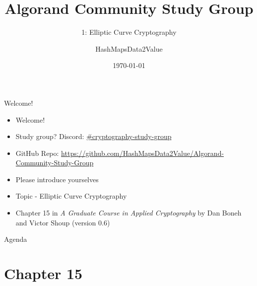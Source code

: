 \documentclass[aspectratio=169,xcolor=dvipsnames]{beamer}
\title[short title]{Algorand Community Study Group}
\subtitle{1: Elliptic Curve Cryptography}
\author[HMD2V] {HashMapsData2Value}
\institute[Algorand] %
{
    Digital Community Champion \\
    Algorand Foundation \\
    \vskip 3pt
}
\date{\today} %
\begin{document}
\begin{frame}
    \titlepage
\end{frame}


\begin{frame}{Welcome!}
\begin{itemize}
    \item Welcome!
    \item Study group? Discord: \href{https://discordapp.com/channels/491256308461207573/1092424979091566622}{\#cryptography-study-group}
    \item GitHub Repo: \href{https://github.com/HashMapsData2Value/Algorand-Community-Study-Group/tree/main/Topics}{https://github.com/HashMapsData2Value/Algorand-Community-Study-Group}
    \item Please introduce yourselves
    \item Topic - Elliptic Curve Cryptography
    \item Chapter 15 in \textit{A Graduate Course in Applied Cryptography} by Dan Boneh and Victor Shoup (version 0.6)
\end{itemize}
\end{frame}

\begin{frame}{Agenda}
    \tableofcontents
\end{frame}

\section{Chapter 15}
\end{document}
